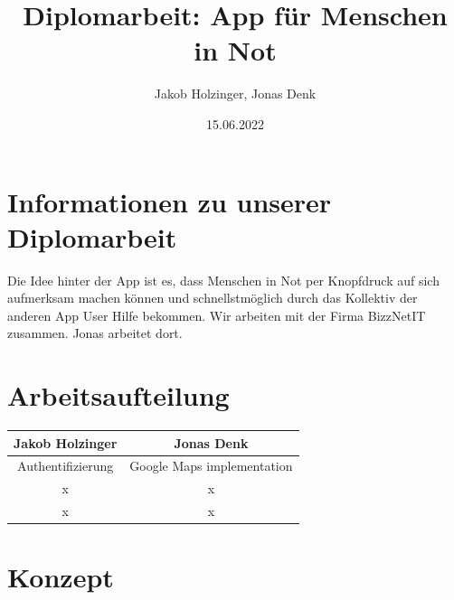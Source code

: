 \documentclass{article}
\title{Diplomarbeit: App für Menschen in Not}
\date{15.06.2022}
\author{Jakob Holzinger, Jonas Denk}
\begin{document}
\maketitle
\frenchspacing
\raggedbottom
\pagestyle{plain}
\section{Informationen zu unserer Diplomarbeit}
Die Idee hinter der App ist es, dass Menschen in Not per Knopfdruck auf sich aufmerksam machen können und schnellstmöglich durch das Kollektiv der anderen App User Hilfe bekommen.
Wir arbeiten mit der Firma BizzNetIT zusammen. Jonas arbeitet dort.
\section{Arbeitsaufteilung}
\begin{table}[H]
	\centering
	\begin{tabular}{|c|c|}
		\hline
		Jakob Holzinger   & Jonas Denk                 \\ \hline
		Authentifizierung & Google Maps implementation \\ \hline
		x                 & x                          \\ \hline
		x                 & x                          \\ \hline
	\end{tabular}
\end{table}
\section{Konzept}
\end{document}
